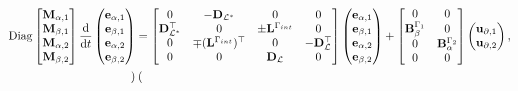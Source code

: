 \documentclass[11pt,a4paper]{article}
\begin{document}
\begin{equation}
\begin{aligned}
    \mathrm{Diag}
        \begin{bmatrix}
            \mathbf{M}_{\alpha, 1} \\
            \mathbf{M}_{\beta, 1}\\
            \mathbf{M}_{\alpha, 2}\\
            \mathbf{M}_{\beta, 2}
        \end{bmatrix} \odv{}{t}
        \begin{pmatrix}
            \mathbf{e}_{\alpha, 1} \\
            \mathbf{e}_{\beta, 1} \\
            \mathbf{e}_{\alpha, 2} \\
            \mathbf{e}_{\beta, 2}
        \end{pmatrix} &= 
        \begin{bmatrix}
            0 & -\mathbf{D}_{\mathcal{L}^*} & 0 & 0 \\
            \mathbf{D}_{\mathcal{L}^*}^\top & 0 & \pm \mathbf{L}^{\Gamma_{\rm int}} & 0 \\
            0 & \mp (\mathbf{L}^{\Gamma_{\rm int}})^\top & 0 & -\mathbf{D}_\mathcal{L}^\top \\
            0 & 0 & \mathbf{D}_\mathcal{L} & 0
        \end{bmatrix}
        \begin{pmatrix}
            \mathbf{e}_{\alpha,1} \\
            \mathbf{e}_{\beta,1} \\
            \mathbf{e}_{\alpha,2} \\
            \mathbf{e}_{\beta,2}
        \end{pmatrix} + 
        \begin{bmatrix}
            0 & 0 \\
            \mathbf{B}_\beta^{\Gamma_1} & 0\\
            0 & \mathbf{B}_\alpha^{\Gamma_2} \\
            0 & 0 
        \end{bmatrix}
        \begin{pmatrix}
            \mathbf{u}_{\partial,1} \\
            \mathbf{u}_{\partial,2} \\
        \end{pmatrix}, \\
        \begin{pmatrix}

\end{pmatrix}
\end{aligned}
\end{equation}
\end{document}
